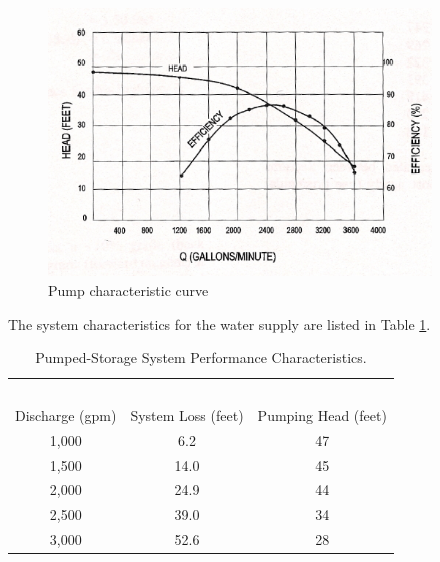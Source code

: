 \documentclass[12 pt]{article}
\begin{document}
\begin{figure}[h!] %
\centering
   \includegraphics[width=4in]{PumpCurve.png}
   \caption{Pump characteristic curve}
   \label{fig:PumpCurve} 
\end{figure}

The system characteristics for the water supply are listed in Table \ref{tab:SystemCurve}. 
\begin{table}[htbp]
   \centering
      \caption{Pumped-Storage System Performance Characteristics.}

   \begin{tabular}{ccc} 
   ~&~&~\\
   Discharge (gpm) & System Loss (feet) & Pumping Head (feet) \\
   \hline
   \hline
   1,000 & 6.2 & 47 \\
   1,500 & 14.0 & 45 \\
      2,000 & 24.9 & 44 \\
         2,500 & 39.0 & 34 \\
            3,000 & 52.6 & 28 \\     
            \hline
   \end{tabular}
   \label{tab:SystemCurve}
\end{table}
\newpage
\end{document}

